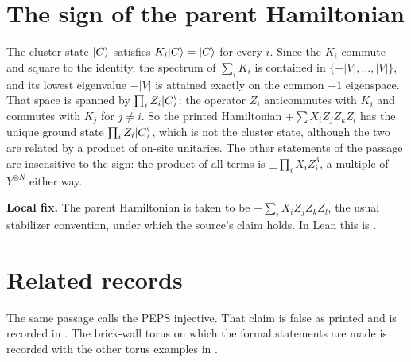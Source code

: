 \documentclass{article}
\begin{document}
\section{The sign of the parent Hamiltonian}
The cluster state $|C\rangle$ satisfies $K_i|C\rangle=|C\rangle$ for every $i$.
Since the $K_i$ commute and square to the identity, the spectrum of
$\sum_iK_i$ is contained in $\{-|V|,\ldots,|V|\}$, and its lowest eigenvalue
$-|V|$ is attained exactly on the common $-1$ eigenspace. That space is
spanned by $\prod_iZ_i|C\rangle$: the operator $Z_i$ anticommutes with $K_i$
and commutes with $K_j$ for $j\neq i$. So the printed Hamiltonian
$+\sum X_iZ_jZ_kZ_l$ has the unique ground state $\prod_iZ_i|C\rangle$, which
is not the cluster state, although the two are related by a product of
on-site unitaries. The other statements of the passage are insensitive to
the sign: the product of all terms is $\pm\prod_i X_iZ_i^3$, a multiple of
$Y^{\otimes N}$ either way.

\textbf{Local fix.} The parent Hamiltonian is taken to be
$-\sum_iX_iZ_jZ_kZ_l$, the usual stabilizer convention, under which the
source's claim holds. In Lean this is .

\section{Related records}
The same passage calls the PEPS injective. That claim is false as printed and
is recorded in \cite{gap:rmp_honeycomb_cluster_injectivity}. The brick-wall
torus on which the formal statements are made is recorded with the other
torus examples in \cite{gap:rmp_peps_examples_small_torus}.



\end{document}
